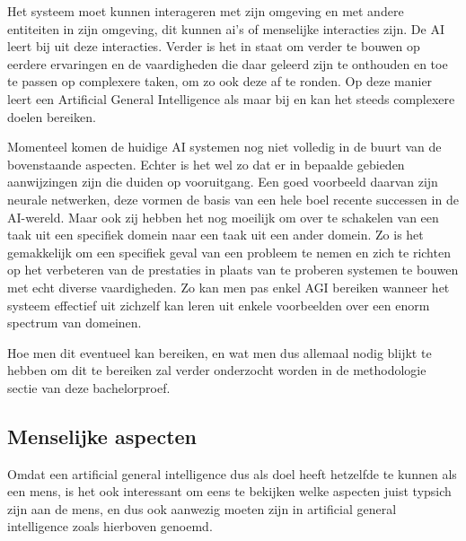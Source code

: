 Het systeem moet kunnen interageren met zijn omgeving en met andere entiteiten in zijn omgeving, dit kunnen ai's of menselijke interacties zijn. De AI leert bij uit deze interacties. Verder is het in staat om verder te bouwen op eerdere ervaringen en de vaardigheden die daar geleerd zijn te onthouden en toe te passen op complexere taken, om zo ook deze af te ronden. Op deze manier leert een Artificial General Intelligence als maar bij en kan het steeds complexere doelen bereiken.

\autocite{goertzel2007artificial}

Momenteel komen de huidige AI systemen nog niet volledig in de buurt van de bovenstaande aspecten. Echter is het wel zo dat er in bepaalde gebieden aanwijzingen zijn die duiden op vooruitgang. Een goed voorbeeld daarvan zijn neurale netwerken, deze vormen de basis van een hele boel recente successen in de AI-wereld. Maar ook zij hebben het nog moeilijk om over te schakelen van een taak uit een specifiek domein naar een taak uit een ander domein. Zo is het gemakkelijk om een specifiek geval van een probleem te nemen en zich te richten op het verbeteren van de prestaties in plaats van te proberen systemen te bouwen met echt diverse vaardigheden. Zo kan men pas enkel AGI bereiken wanneer het systeem effectief uit zichzelf kan leren uit enkele voorbeelden over een enorm spectrum van domeinen.

Hoe men dit eventueel kan bereiken, en wat men dus allemaal nodig blijkt te hebben om dit te bereiken zal verder onderzocht worden in de methodologie sectie van deze bachelorproef.

\autocite{shevlin2019limits}

\subsection{Menselijke aspecten}

Omdat een artificial general intelligence dus als doel heeft hetzelfde te kunnen als een mens, is het ook interessant om eens te bekijken welke aspecten juist typsich zijn aan de mens, en dus ook aanwezig moeten zijn in artificial general intelligence zoals hierboven genoemd.



